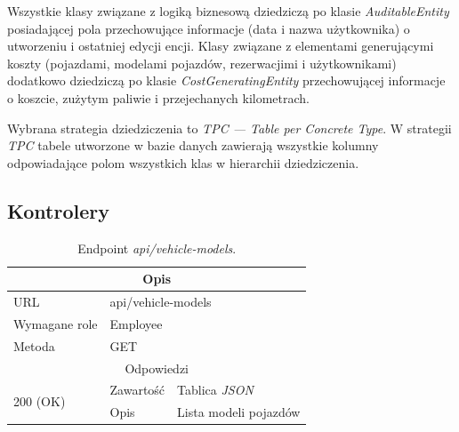 \documentclass[eng,printmode,openany]{mgr}
\begin{document}
	\newpage 
	Wszystkie klasy związane z logiką biznesową dziedziczą po klasie \textit{AuditableEntity} posiadającej pola przechowujące informacje (data i nazwa użytkownika) o utworzeniu i ostatniej edycji encji. Klasy związane z elementami generującymi koszty (pojazdami, modelami pojazdów, rezerwacjimi i użytkownikami) dodatkowo dziedziczą po klasie \textit{CostGeneratingEntity} przechowującej informacje o koszcie, zużytym paliwie i przejechanych kilometrach. 
	
	Wybrana strategia dziedziczenia to \textit{TPC — Table per Concrete Type}. W strategii \textit{TPC} tabele utworzone w bazie danych zawierają wszystkie kolumny odpowiadające polom wszystkich klas w hierarchii dziedziczenia.
	
	
	
	
	
	\subsection{Kontrolery}
	
	\begin{table}[H]
		\caption{Endpoint \textit{api/vehicle-models}.}
		\begin{tabularx}{\textwidth}{|l|l|X|}
			\hline
			\multicolumn{3}{|c|}{Opis}
			\\ \hline
			URL                         & \multicolumn{2}{l|}{api/vehicle-models}
			\\ \hline
			Wymagane role               & \multicolumn{2}{l|}{Employee}
			\\ \hline
			Metoda                      & \multicolumn{2}{l|}{GET}
			\\ \hline
			\multicolumn{3}{|c|}{ Odpowiedzi}
			\\ \hline
			\multirow{2}{*}{200 (OK)}   & Zawartość         & Tablica \textit{JSON}
			\\ \cline{2-3}              & Opis         	    & Lista modeli pojazdów
			\\ \hline
		\end{tabularx}
	\end{table}
	
\end{document}
